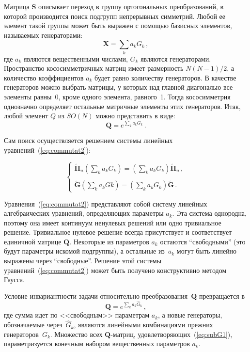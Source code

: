 \documentclass{llncs}
\begin{document}
Матрица $\textbf{S}$ описывает переход в группу ортогональных преобразований, в которой производится поиск подгрупп непрерывных симметрий.
Любой ее элемент такой группы может быть выражен с помощью базисных элементов, называемых генераторами:
%
\begin{equation}
\textbf{X} = \sum_k a_k G_k \, ,
\end{equation}
%
где $ a_k $ являются вещественными числами, $G_k $ являются генераторами. Пространство кососимметричных матриц имеет размерность $N(N-1)/2$, а количество коэффициентов $a_k$ будет равно количеству генераторов. В качестве генераторов можно выбрать матрицы, у которых над главной диагональю все элементы равны~0, кроме одного элемента, равного~1. Тогда кососимметрия однозначно определяет остальные матричные элементы этих генераторов. Итак, любой элемент $Q$ из $SO(N)$ можно представить в виде:
%
\begin{equation}
\label{eq:sunexp}
\textbf{Q}=e^{\sum_k a_k G_k} \, .
\end{equation}
%

Сам поиск осуществляется решением системы линейных уравнений~(\ref{eq:commutat2}):

%
\begin{equation}
\label{eq:commutat2}
\left\{
\begin{array}{l}
\displaystyle
\tilde{\textbf{H}}_n \left(\sum\limits_ka_kG_k\right) =
\left(\sum\limits_ka_kG_k\right) \tilde{\textbf{H}}_n \, , \\ \\
\displaystyle
\tilde{\textbf{G}} \left(\sum\limits_ka_kGk\right) = \left(\sum\limits_ka_kG_k\right) \tilde{\textbf{G}} \, .
\end{array}
\right.
\end{equation}
%

Уравнения~(\ref{eq:commutat2}) представляют собой систему линейных алгебраических уравнений, определяющих параметры $a_k$. Эта система однородна, поэтому она имеет континуум ненулевых решений или одно тривиальное решение. Тривиальное нулевое решение всегда присутствует и соответствует единичной матрице $\textbf{Q}$. Некоторые из параметров $a_k$ остаются ``свободными'' (это будут параметры искомой подгруппы), а остальные из~$a_k$ могут быть линейно выражены через ``свободные''. Решение этой системы уравнений~(\ref{eq:commutat2}) может быть получено конструктивно методом Гаусса.

Условие инвариантности задачи относительно преобразования~$\textbf{Q}$ превращается в
%
\begin{equation}
\label{eq:subG1}
\textbf{Q}=e^{\sum_k a_k \hat{G}_k} \, ,
\end{equation}
%
где сумма идет по <<свободным>> параметрам $a_k$, а новые генераторы, обозначаемые через~$\hat{G}_k$, являются линейными комбинациями прежних генераторов~$G_k$. Множество всех $\textbf{Q}$-матриц, удовлетворяющих~(\ref{eq:subG1}), параметризуется конечным набором вещественных параметров $a_k$.
\end{document}
